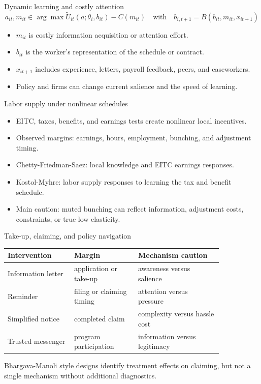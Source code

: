 \documentclass[aspectratio=169,11pt]{beamer}
\begin{document}
\begin{frame}{Dynamic learning and costly attention}
\[
a_{it}, m_{it} \in \arg\max \tilde{U}_{it}(a;\theta_i,b_{it}) - C(m_{it})
\quad \text{with} \quad
b_{i,t+1}=B(b_{it},m_{it},x_{it+1})
\]

\begin{itemize}
    \item $m_{it}$ is costly information acquisition or attention effort.
    \item $b_{it}$ is the worker's representation of the schedule or contract.
    \item $x_{it+1}$ includes experience, letters, payroll feedback, peers, and caseworkers.
    \item Policy and firms can change current salience and the speed of learning.
\end{itemize}
\end{frame}

\begin{frame}{Labor supply under nonlinear schedules}
\begin{itemize}
    \item EITC, taxes, benefits, and earnings tests create nonlinear local incentives.
    \item Observed margins: earnings, hours, employment, bunching, and adjustment timing.
    \item Chetty-Friedman-Saez: local knowledge and EITC earnings responses.
    \item Kostol-Myhre: labor supply responses to learning the tax and benefit schedule.
    \item Main caution: muted bunching can reflect information, adjustment costs, constraints, or true low elasticity.
\end{itemize}
\end{frame}

\begin{frame}{Take-up, claiming, and policy navigation}
\small
\begin{tabular}{p{0.26\linewidth} p{0.25\linewidth} p{0.33\linewidth}}
\toprule
Intervention & Margin & Mechanism caution \\
\midrule
Information letter & application or take-up & awareness versus salience \\
Reminder & filing or claiming timing & attention versus pressure \\
Simplified notice & completed claim & complexity versus hassle cost \\
Trusted messenger & program participation & information versus legitimacy \\
\bottomrule
\end{tabular}

\vspace{0.6em}
Bhargava-Manoli style designs identify treatment effects on claiming, but not a single mechanism without additional diagnostics.
\end{frame}
\end{document}
